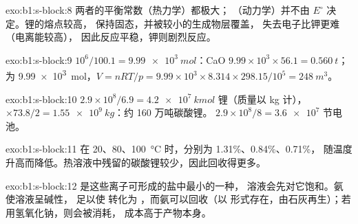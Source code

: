 \begin{solution}{exo:b1:s-block:8}
两者的平衡常数（热力学）都极大；
（动力学）并不由 $E^\circ$ 决定。锂的熔点较高，
保持固态，并被较小的生成物层覆盖，
失去电子比钾更难（电离能较高），
因此反应平稳，钾则剧烈反应。
\end{solution}

\begin{solution}{exo:b1:s-block:9}
$10^6/100.1 = \qty{9.99e3}{mol}$：CaO $9.99 \times 10^3 \times 56.1 =
\qty{0.560}{t}$； 为 \qty{9.99e3}{mol}，$V = nRT/p = 9.99 \times 10^3
\times 8.314 \times 298.15/10^5 = \qty{248}{m^3}$。
\end{solution}

\begin{solution}{exo:b1:s-block:10}
$2.9 \times 10^8/6.9 = \qty{4.2e7}{kmol}$ 锂（质量以 kg 计），$\times 73.8/2 =
\qty{1.55e9}{kg}$：约 160 万吨碳酸锂。
$2.9 \times 10^8/8 = \num{3.6e7}$ 节电池。
\end{solution}

\begin{solution}{exo:b1:s-block:11}
在 20、80、\qty{100}{\celsius} 时，分别为 1.31\%、0.84\%、0.71\%，
随温度升高而降低。热溶液中残留的碳酸锂较少，因此回收得更多。
\end{solution}

\begin{solution}{exo:b1:s-block:12}
 是这些离子可形成的盐中最小的一种，
溶液会先对它饱和。氨使溶液呈碱性，
足以使  转化为 ，而氨可以回收（以
 形式存在，由石灰再生）；若用氢氧化钠，则会被消耗，
成本高于产物本身。
\end{solution}

